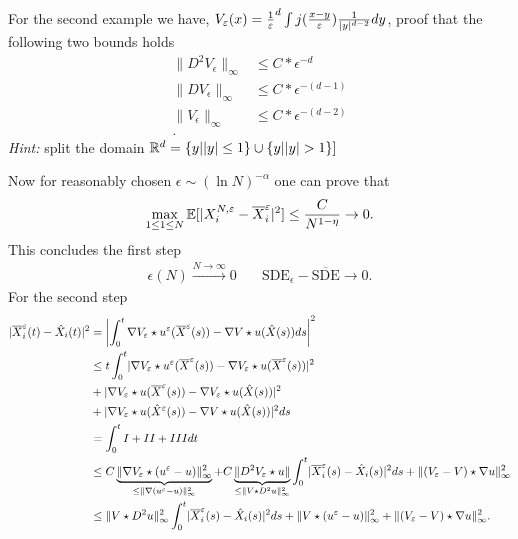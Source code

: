 \begin{exercise}
 For the second example we have, $V_\epsilon(x) = \frac{1}{\epsilon}^{d} \int  j(\frac{x-y}{\epsilon})\frac{1}{\abs{y}^{d-2} } dy $,
 proof that the following two bounds holds
 \begin{align*}
   \|D^2 V_{\epsilon}\|_{\infty}&\le C*\epsilon^{-d}\\
   \|D V_{\epsilon}\|_{\infty}&\le C*\epsilon ^{-(d-1)}  \\
   \|V_{\epsilon}\|_{\infty}&\le C*\epsilon ^{-(d-2)}  \\
 .\end{align*}
 \textit{Hint:} split the domain $\mathbb{R}^{d} = \{y | \abs{y} \le 1\}  \cup \{y | \abs{y} >1\}  ] $
\end{exercise}
Now for reasonably chosen $\epsilon \sim (\ln N)^{-\alpha } $ one can prove that 
\begin{align*}
  \max_{1\le 1\le N} \E[\abs{X_i^{N,\epsilon} -\overline{X}^{\epsilon}_i  }^2]\le \frac{C}{N^{1-\eta } } \to  0
.\end{align*}
This concludes the first step
\begin{align*}
  \epsilon(N) \xrightarrow{N\to \infty} 0   \quad &\text{SDE}_\epsilon - \overline{\text{SDE}} \to 0 
.\end{align*}
For the second step 
\begin{align*}
  \abs{\overline{X}_i^{\epsilon}(t) - \hat{X}_i(t)    }^2 &= \abs*{\int_0^{t} \nabla V_{\epsilon} \star  u^{\epsilon}(\overline{X}^{\epsilon} (s))- \nabla V  \star  u(\hat{X}(s)  ) ds }^2\\
                                                                     &\le t \int_0^{t} \abs{\nabla V_\epsilon \star  u^{\epsilon}(\overline{X}^{\epsilon}(s)  ) - \nabla V_{\epsilon} \star  u(\overline{X}^{\epsilon}(s)  ) }^2    \\
                                                                     &+ \abs{\nabla V_\epsilon \star  u(\overline{X}^{\epsilon}(s)  ) - \nabla V_{\epsilon} \star  u(\hat{X}(s)  )}^2 \\
                                                                     &+ \abs{\nabla V_\epsilon \star u(\hat{X}^{\epsilon}(s)  ) - \nabla V \star  u(\hat{X}(s)  )}^2 ds\\
                                                                     &= \int_0^{t}  I + II + III dt \\
                                                                     &\le C \underbrace{\|\nabla V_\epsilon \star (u^{\epsilon}-u )\|^2_{\infty}}_{\le  \|\nabla(u^{\epsilon}-u )\|_{\infty}^{2} } +C\underbrace{\|D^2 V_\epsilon \star  u\|}_{\le \|V \star  D^2u\|_{\infty}^2}  \int_0^{t} \abs{\overline{X}_i^{\epsilon}(s) - \hat{X}_i(s) }^2 ds + \|(V_\epsilon - V) \star  \nabla u\|_{\infty}^2\\
                                                                     &\le  \|V\star D^2u\|_{\infty}^2 \int_0^{t} \abs{\overline{X}_i^{\epsilon}(s)-\hat{X}_i(s)   }^2 ds + \|V \star (u^{\epsilon}-u )\|_{\infty}^2 + \|(V_{\epsilon}-V) \star  \nabla u\|_{\infty}^2
.\end{align*}
